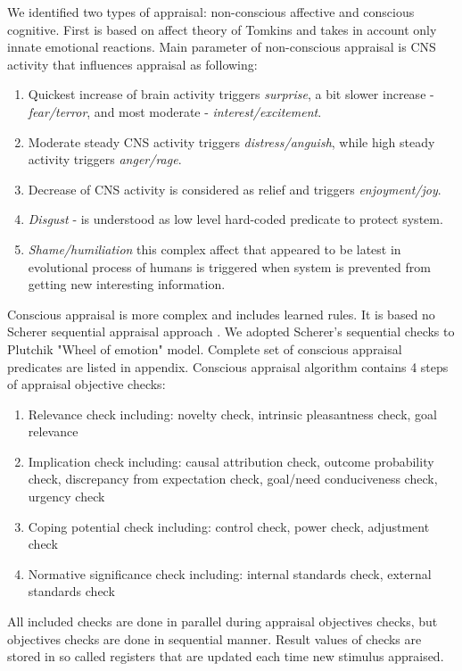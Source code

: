 We identified two types of appraisal: non-conscious affective and conscious cognitive. First is based on affect theory of Tomkins \cite{primer_affect_psychology} and takes in account only innate emotional reactions. Main parameter of non-conscious appraisal is CNS activity that influences appraisal as following:

\begin{enumerate}
	\item Quickest increase of brain activity triggers \emph{surprise}, a bit slower increase - \emph{fear/terror}, and most moderate - \emph{interest/excitement}.
	\item Moderate steady CNS activity triggers \emph{distress/anguish}, while high steady activity triggers \emph{anger/rage}.
	\item Decrease of CNS activity is considered as relief and triggers \emph{enjoyment/joy}.
	\item \emph{Disgust} - is understood as low level hard-coded predicate to protect system.
	\item \emph{Shame/humiliation} this complex affect that appeared to be latest in evolutional process of humans is triggered when system is prevented from getting new interesting information.
\end{enumerate}

Conscious appraisal is more complex and includes learned rules. It is based no Scherer sequential appraisal approach \cite{appraisal_considered_as_a_process}. We adopted Scherer's sequential checks to Plutchik "Wheel of emotion" \cite{natureofemotions} model. Complete set of conscious appraisal predicates are listed in appendix. Conscious appraisal algorithm contains 4 steps of appraisal objective checks:

\begin{enumerate}
	\item  Relevance check including: novelty check, intrinsic pleasantness check, goal relevance
	\item  Implication check including: causal attribution check, outcome probability check, discrepancy from expectation check, goal/need conduciveness check, urgency check
	\item  Coping potential check including: control check, power check, adjustment check
	\item  Normative significance check including: internal standards check, external standards check
\end{enumerate}

All included checks are done in parallel during appraisal objectives checks, but objectives checks are done in sequential manner.
Result values of checks are stored in so called registers that are updated each time new stimulus appraised.

